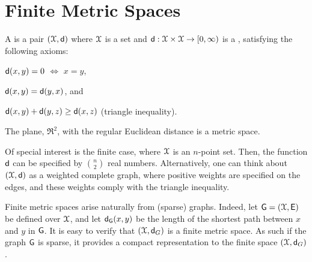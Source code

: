 %

%


% 

\ChapterPrefix{}
\ChapterGen{}



\section{Finite Metric Spaces}



\begin{defn}
    A  is a pair
    $(\FMS, \DistChar)$ where $\FMS$ is a set and
    $\DistChar: \FMS \times \FMS \rightarrow [0, \infty)$ is a
    , satisfying the following axioms:
    \begin{compactenumi}
        \item $\mathsf{d}(x,y) = 0$ $\iff$ $x =y$,
        \item $\DistMtr{x}{y}= \DistMtr{y}{x}$, and
        \item $\DistMtr{x}{y} + \DistMtr{y}{z} \geq \DistMtr{x}{z}$
        (triangle inequality).
    \end{compactenumi}
\end{defn}

The plane, $\Re^2$, with the regular Euclidean distance is a metric
space.

Of special interest is the finite case, where $\FMS$ is an $n$-point
set. Then, the function $\mathsf{d}$ can be specified by $\binom{n}{2}$
real numbers. Alternatively, one can think about $(\FMS,\DistChar)$ as
a weighted complete graph, where positive weights are specified on the
edges, and these weights comply with the triangle inequality.

Finite metric spaces arise naturally from (sparse) graphs.  Indeed, let
$\Graph=(\FMS,\Edges)$ be  defined over
$\FMS$, and let $\dGY{x}{y}$ be the length of the shortest path
between $x$ and $y$ in $\mathsf{G}$. It is easy to verify that
$(\FMS, \DistChar_G)$ is a finite metric space. As such if the graph
$\mathsf{G}$ is sparse, it provides a compact representation to the finite
space $(\FMS, \DistChar_G)$.

